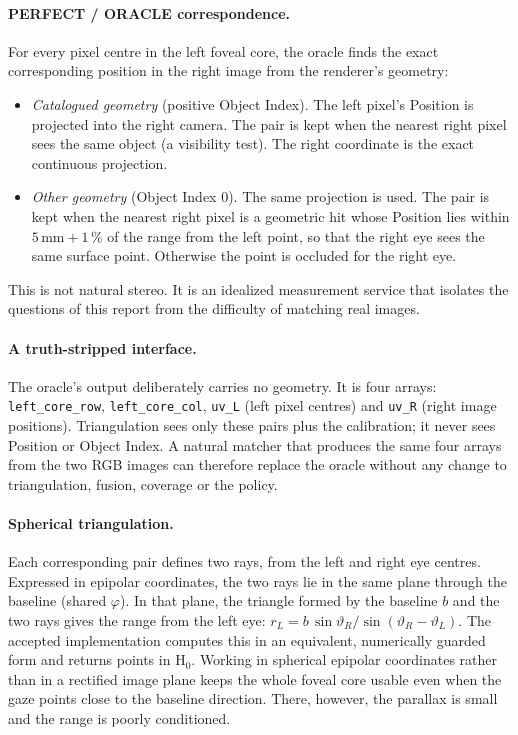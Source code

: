 \documentclass[11pt,a4paper]{article}
\newcommand{\code}[1]{\texttt{\small #1}}
\newcommand{\Hz}{\ensuremath{\mathrm{H}_0}}
\newcommand{\pct}[1]{#1\,\%}
\begin{document}
\paragraph{PERFECT / ORACLE correspondence.} For every pixel centre in the left foveal core, the oracle finds the exact
corresponding position in the right image from the renderer's geometry:
\begin{itemize}
  \item \emph{Catalogued geometry} (positive Object Index). The left pixel's Position is projected into the right
        camera. The pair is kept when the nearest right pixel sees the same object (a visibility test). The right
        coordinate is the exact continuous projection.
  \item \emph{Other geometry} (Object Index 0). The same projection is used. The pair is kept when the nearest right
        pixel is a geometric hit whose Position lies within $5\,\mathrm{mm} + \pct{1}$ of the range from the left
        point, so that the right eye sees the same surface point. Otherwise the point is occluded for the right eye.
\end{itemize}
This is not natural stereo. It is an idealized measurement service that isolates the questions of this report from
the difficulty of matching real images.

\paragraph{A truth-stripped interface.} The oracle's output deliberately carries no geometry. It is four arrays:
\code{left\_core\_row}, \code{left\_core\_col}, \code{uv\_L} (left pixel centres) and \code{uv\_R} (right image
positions). Triangulation sees only these pairs plus the calibration; it never sees Position or Object Index. A
natural matcher that produces the same four arrays from the two RGB images can therefore replace the oracle without
any change to triangulation, fusion, coverage or the policy.

\paragraph{Spherical triangulation.} Each corresponding pair defines two rays, from the left and right eye centres.
Expressed in epipolar coordinates, the two rays lie in the same plane through the baseline (shared $\varphi$). In that
plane, the triangle formed by the baseline $b$ and the two rays gives the range from the left eye:
$r_L = b\,\sin\vartheta_R / \sin(\vartheta_R - \vartheta_L)$. The accepted implementation computes this in an
equivalent, numerically guarded form and returns points in \Hz{}. Working in spherical epipolar coordinates rather
than in a rectified image plane keeps the whole foveal core usable even when the gaze points close to the baseline
direction. There, however, the parallax is small and the range is poorly conditioned.
\end{document}
